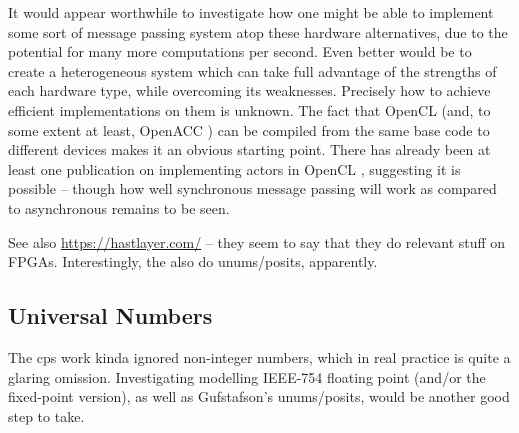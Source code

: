 It would appear worthwhile to investigate how one might be able to implement some sort of message passing system atop these hardware alternatives, due to the potential for many more computations per second.  Even better would be to create a heterogeneous system which can take full advantage of the strengths of each hardware type, while overcoming its weaknesses.  Precisely how to achieve efficient implementations on them is unknown.  The fact that OpenCL \fxerror[inline]{[ref]} (and, to some extent at least, OpenACC \fxerror[inline]{[ref]}) can be compiled from the same base code to different devices makes it an obvious starting point.   There has already been at least one publication on implementing \glspl{actor} in OpenCL \fxerror[inline]{[ref]}, suggesting it is possible -- though how well synchronous message passing will work as compared to asynchronous remains to be seen.

See also \url{https://hastlayer.com/} -- they seem to say that they do relevant stuff on FPGAs.  Interestingly, the also do unums/posits, apparently.

\subsection{Universal Numbers}
The \gls{cps} work kinda ignored non-integer numbers, which in real practice is quite a glaring omission.  Investigating modelling IEEE-754 floating point (and/or the fixed-point version), as well as Gufstafson's unums/posits, would be another good step to take.